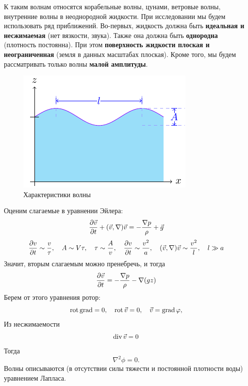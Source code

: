 К таким волнам относятся корабельные волны, цунами, ветровые волны, внутренние волны в неоднородной жидкости. При исследовании мы будем использовать ряд приближений. Во-первых, жидкость должна быть \textbf{идеальная и несжимаемая} (нет вязкости, звука). Также она должна быть \textbf{однородна} (плотность постоянна). При этом \textbf{поверхность жидкости плоская и неограниченная} (земля в данных масштабах плоская). Кроме того, мы будем рассматривать только волны \textbf{малой амплитуды}.

\begin{figure}[H]
    \centering
    \includegraphics[scale=1.5]{img/simple_wave}
    \caption{Характеристики волны}
    \label{fig:simplewave}
\end{figure}

Оценим слагаемые в уравнении Эйлера:
\begin{gather}
	\label{eq}
	\pdv{\vec{v}}{t}+(\vec{v},\nabla)\vec{v}=-\frac{\nabla p}{\rho}+\vec{g}
\end{gather}
\begin{gather}
	\label{eq}
	\pdv{v}{t}\sim\frac{v}{\tau}, \quad 
	A\sim V\tau, \quad \tau \sim \frac{A}{v},
	\quad \pdv{v}{t}\sim \frac{v^2}{a}, 
	\quad (\vec{v},\nabla)\vec{v}\sim \frac{v^2}{l},
	\quad l\gg a
\end{gather}
Значит, вторым слагаемым можно пренебречь, и тогда
\begin{gather}
	\label{eq}
	\pdv{\vec{v}}{t}=-\frac{\nabla p}{\rho}-\nabla(gz)
\end{gather}
Берем от этого уравнения ротор:
\begin{equation}
	\operatorname{rot}\operatorname{grad}=0, \quad
	\operatorname{rot}\vec{v}=0, \quad \vec{v}=\operatorname{grad}\varphi,
\end{equation}
Из несжимаемости
\begin{equation}
	\operatorname{div}\vec{v}=0
\end{equation}
Тогда
\begin{equation}
	\nabla^2\phi=0.
\end{equation}
Волны описываются (в отсутствии силы тяжести и постоянной плотности воды) уравнением Лапласа. 

